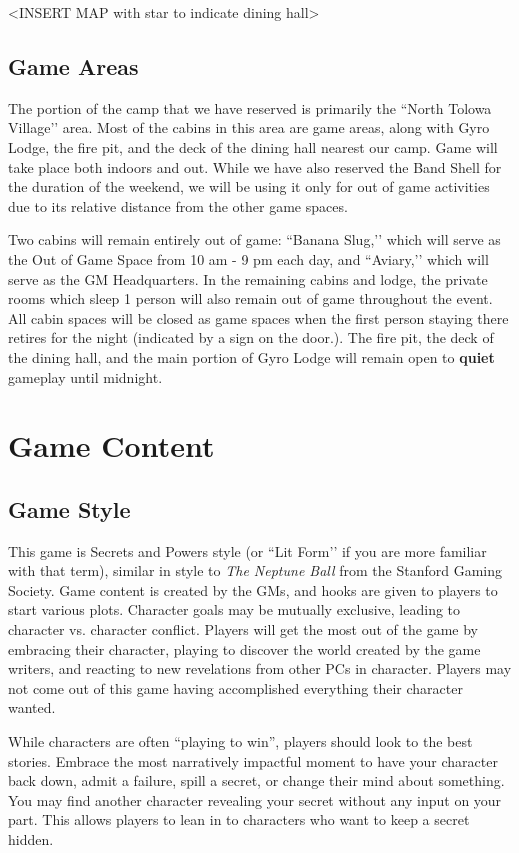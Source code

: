 \documentclass[sheet]{GL2020}
\begin{document}
<INSERT MAP with star to indicate dining hall>


\subsection{Game Areas}
The portion of the camp that we have reserved is primarily the ``North Tolowa Village’’ area. Most of the cabins in this area are game areas, along with Gyro Lodge, the fire pit, and the deck of the dining hall nearest our camp. Game will take place both indoors and out. While we have also reserved the Band Shell for the duration of the weekend, we will be using it only for out of game activities due to its relative distance from the other game spaces.

Two cabins will remain entirely out of game: ``Banana Slug,’’ which will serve as the Out of Game Space from 10 am - 9 pm each day, and ``Aviary,’’ which will serve as the GM Headquarters. In the remaining cabins and lodge, the private rooms which sleep 1 person will also remain out of game throughout the event. All cabin spaces will be closed as game spaces when the first person staying there retires for the night (indicated by a sign on the door.). The fire pit, the deck of the dining hall, and the main portion of Gyro Lodge will remain open to \textbf{quiet} gameplay until midnight.

\section{Game Content}
\subsection{Game Style}
This game is Secrets and Powers style (or ``Lit Form’’ if you are more familiar with that term), similar in style to  \emph{The Neptune Ball} from the Stanford Gaming Society. Game content is created by the GMs, and hooks are given to players to start various plots. Character goals may be mutually exclusive, leading to character vs. character conflict. Players will get the most out of the game by embracing their character, playing to discover the world created by the game writers, and reacting to new revelations from other PCs in character. Players may not come out of this game having accomplished everything their character wanted. 

While characters are often “playing to win”, players should look to the best stories. Embrace the most narratively impactful moment to have your character back down, admit a failure, spill a secret, or change their mind about something. You may find another character revealing your secret without any input on your part. This allows players to lean in to characters who want to keep a secret hidden.
\end{document}
